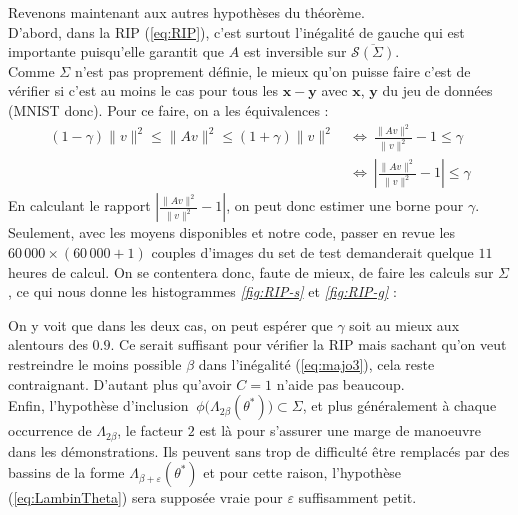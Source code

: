 \documentclass[hidelinks, french]{article} %
\newcommand{\Llr}{\Longleftrightarrow}
\renewcommand{\epsilon}{\varepsilon}
\renewcommand{\leq}{\leqslant}
\renewcommand{\bf}[1]{\boldsymbol{#1}}
\theoremstyle{enonce}
\theoremstyle{special}
\theoremstyle{rq}
\theoremstyle{exo}
\theoremstyle{demo}
\begin{document}
Revenons maintenant aux autres hypothèses du théorème.
\\
D'abord, dans la RIP (\ref{eq:RIP}), c'est surtout l'inégalité de gauche qui est importante puisqu'elle garantit que $A$ est inversible sur $\overline{\mathcal{S}(\Sigma)}$.
\\
Comme $\Sigma$ n'est pas proprement définie, le mieux qu'on puisse faire c'est de vérifier si c'est au moins le cas pour tous les $\bf{x}-\bf{y}$ avec $\bf{x}$, $\bf{y}$ du jeu de données (MNIST donc). Pour ce faire, on a les équivalences :
\begin{align*}(1-\gamma)\|v\|^2\leq \|Av\|^2\leq (1+\gamma)\|v\|^2\ &\Llr\ \frac{\|Av\|^2}{\|v\|^2}-1\leq \gamma\\
	&\Llr\ \left|\frac{\|Av\|^2}{\|v\|^2}-1\right|\leq \gamma\end{align*}
En calculant le rapport $\left|\frac{\|Av\|^2}{\|v\|^2}-1\right|$, on peut donc estimer une borne pour $\gamma$. Seulement, avec les moyens disponibles et notre code, passer en revue les $60\,000\times(60\,000+1)$ couples d'images du set de test demanderait quelque $11$ heures de calcul. On se contentera donc, faute de mieux, de faire les calculs sur $\Sigma$, ce qui nous donne les histogrammes \textit{\ref{fig:RIP-s}} et \textit{\ref{fig:RIP-g}} :
\\

\begin{figure}[h]
	\begin{floatrow}
		{
		}
		
		{
		}
\end{floatrow}\end{figure}

\noindent On y voit que dans les deux cas, on peut espérer que $\gamma$ soit au mieux aux alentours des $0.9$. Ce serait suffisant pour vérifier la RIP mais sachant qu'on veut restreindre le moins possible $\beta$ dans l'inégalité (\ref{eq:majo3}), cela reste contraignant. D'autant plus qu'avoir $C=1$ n'aide pas beaucoup.
\\

Enfin, l'hypothèse d'inclusion $\ \phi\big(\Lambda_{2\beta}(\theta^*)\big)\subset\Sigma$, et plus généralement à chaque occurrence de $\Lambda_{2\beta}$, le facteur $2$ est là pour s'assurer une marge de manoeuvre dans les démonstrations. Ils peuvent sans trop de difficulté être remplacés par des bassins de la forme $\Lambda_{\beta+\epsilon}(\theta^*)$ et pour cette raison, l’hypothèse (\ref{eq:LambinTheta}) sera supposée vraie pour $\epsilon$ suffisamment petit.
\\
\end{document}
